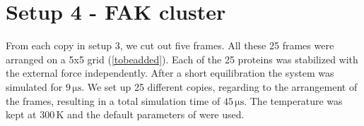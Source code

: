 \section{Setup 4 - FAK cluster}
From each copy in setup 3, we cut out five frames. All these 25 frames were arranged on a {5x5} grid (\autoref{tobeadded}). Each of the 25 proteins was stabilized with the external force independently. After a short equilibration the system was simulated for $9\,\si{\micro\second}$. We set up 25 different copies, regarding to the arrangement of the frames, resulting in a total simulation time of $45\,\si{\micro\second}$. The temperature was kept at $300\,\si{\kelvin}$ and the default parameters of \martini{} were used.